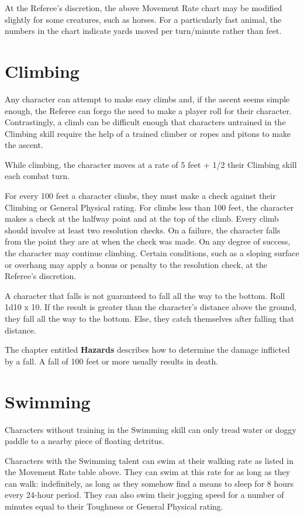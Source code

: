 \documentclass[oneside]{book}
\begin{document}
\begin{multicols}{2}
At the Referee's discretion, the above Movement Rate chart may be modified slightly for some creatures, such as horses. For a particularly fast animal, the numbers in the chart indicate yards moved per turn/minute rather than feet. 

\section{Climbing}
Any character can attempt to make easy climbs and, if the ascent seems simple enough, the Referee can forgo the need to make a player roll for their character. Contrastingly, a climb can be difficult enough that characters untrained in the Climbing skill require the help of a trained climber or ropes and pitons to make the ascent. 

While climbing, the character moves at a rate of 5 feet + 1/2 their Climbing skill each combat turn. 

For every 100 feet a character climbs, they must make a check against their Climbing or General Physical rating. For climbs less than 100 feet, the character makes a check at the halfway point and at the top of the climb. Every climb should involve at least two resolution checks. On a failure, the character falls from the point they are at when the check was made. On any degree of success, the character may continue climbing. Certain conditions, such as a sloping surface or overhang may apply a bonus or penalty to the resolution check, at the Referee's discretion.

A character that falls is not guaranteed to fall all the way to the bottom. Roll 1d10 x 10. If the result is greater than the character's distance above the ground, they fall all the way to the bottom. Else, they catch themselves after falling that distance. 

The chapter entitled \textbf{Hazards} describes how to determine the damage inflicted by a fall. A fall of 100 feet or more usually results in death. 

\section{Swimming}
Characters without training in the Swimming skill can only tread water or doggy paddle to a nearby piece of floating detritus. 

Characters with the Swimming talent can swim at their walking rate as listed in the Movement Rate table above. They can swim at this rate for as long as they can walk: indefinitely, as long as they somehow find a means to sleep for 8 hours every 24-hour period. They can also swim their jogging speed for a number of minutes equal to their Toughness or General Physical rating. 


\end{multicols}
\end{document}
